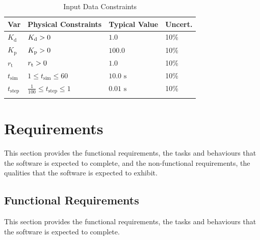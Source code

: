 \documentclass[12pt]{article}
\newcommand{\gt}{\ensuremath >}
\begin{document}
\begin{longtable}{l l l l}
\toprule
\textbf{Var} & \textbf{Physical Constraints} & \textbf{Typical Value} & \textbf{Uncert.}
\\
\midrule
\endhead
${K_{\text{d}}}$ & ${K_{\text{d}}}\gt{}0$ & $1.0$ & 10$\%$
\\
${K_{\text{p}}}$ & ${K_{\text{p}}}\gt{}0$ & $100.0$ & 10$\%$
\\
${r_{\text{t}}}$ & ${r_{\text{t}}}\gt{}0$ & $1.0$ & 10$\%$
\\
${t_{\text{sim}}}$ & $1\leq{}{t_{\text{sim}}}\leq{}60$ & $10.0$ ${\text{s}}$ & 10$\%$
\\
${t_{\text{step}}}$ & $\frac{1}{100}\leq{}{t_{\text{step}}}\leq{}1$ & $0.01$ ${\text{s}}$ & 10$\%$
\\
\bottomrule
\caption{Input Data Constraints}
\label{Table:InDataConstraints}
\end{longtable}
\section{Requirements}
\label{Sec:Requirements}
This section provides the functional requirements, the tasks and behaviours that the software is expected to complete, and the non-functional requirements, the qualities that the software is expected to exhibit.

\subsection{Functional Requirements}
\label{Sec:FRs}
This section provides the functional requirements, the tasks and behaviours that the software is expected to complete.
\end{document}
